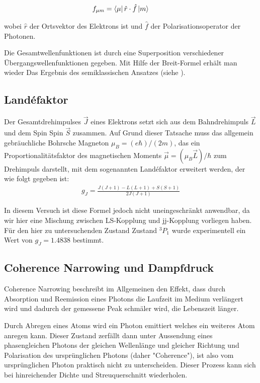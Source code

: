 \documentclass[12pt]{article}
\begin{document}
\begin{align}
f_{\mu m}=\bra{\mu}\hat{r}\cdot\hat{f}\ket{m}\hspace{1cm}
\end{align}

wobei $\hat{r}$ der Ortsvektor des Elektrons ist und $\hat{f}$ der Polarisationsoperator der Photonen.

Die Gesamtwellenfunktionen ist durch eine Superposition verschiedener Übergangswellenfunktionen gegeben. Mit Hilfe der Breit-Formel erhält man wieder Das Ergebnis des semiklassischen Ansatzes (siehe \cite{anleitung}).
 
\subsection{Landéfaktor \label{LF}}          

Der Gesamtdrehimpulses $\vec{J}$ eines Elektrons setzt sich aus dem Bahndrehimpuls $\vec{L}$ und dem Spin Spin $\vec{S}$ zusammen. Auf Grund dieser Tatsache muss das allgemein gebräuchliche Bohrsche Magneton $\mu_B=(e\hbar)/(2m)$, das ein Proportionalitätsfaktor des magnetischen Moments $\vec{\mu}=(\mu_B\vec{L})/\hbar$ zum Drehimpuls darstellt, mit dem sogenannten Landéfaktor erweitert werden, der wie folgt gegeben ist:
\begin{align}
g_J=\frac{J(J+1)-L(L+1)+S(S+1)}{2J(J+1)}
\end{align}

In diesem Versuch ist diese Formel jedoch nicht uneingeschränkt anwendbar, da wir hier eine Mischung zwischen LS-Kopplung und jj-Kopplung vorliegen haben. Für den hier zu untersuchenden Zustand Zustand ${}^3P_1$ wurde experimentell ein Wert von  $g_J=1.4838$ bestimmt.





\subsection{Coherence Narrowing und Dampfdruck \label{Coherence}}

Coherence Narrowing beschreibt im Allgemeinen den Effekt, dass durch Absorption und Reemission eines Photons die Laufzeit im Medium verlängert wird und dadurch der gemessene Peak schmäler wird, die Lebenszeit länger.

Durch Abregen eines Atoms wird ein Photon emittiert welches ein weiteres Atom anregen kann. Dieser Zustand zerfällt dann unter Aussendung eines phasengleichen Photons der gleichen Wellenlänge und gleicher Richtung und Polarisation des ursprünglichen Photons (daher "Coherence"), ist also vom ursprünglichen Photon praktisch nicht zu unterscheiden. Dieser Prozess kann sich bei hinreichender Dichte und Streuquerschnitt wiederholen.
\end{document}
